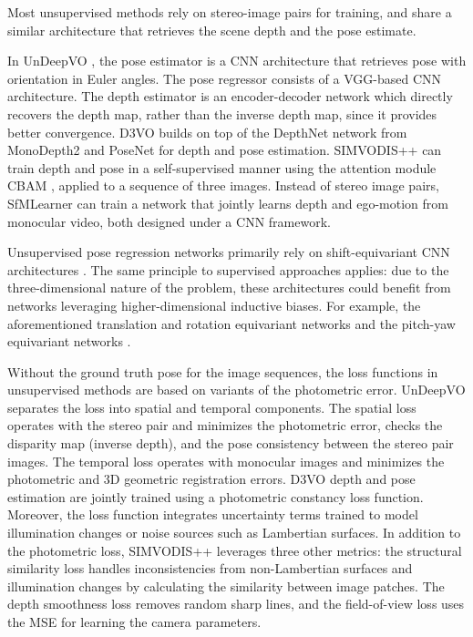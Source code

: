 Most unsupervised methods rely on stereo-image pairs for training, and share a similar architecture that retrieves the scene depth and the pose estimate.

In UnDeepVO \cite{li2018undeepvo}, the pose estimator is a \ac{CNN} architecture that retrieves pose with orientation in Euler angles. The pose regressor consists of a VGG-based \cite{dl:loopclosure:vgg16} \ac{CNN} architecture. The depth estimator is an encoder-decoder network which directly recovers the depth map, rather than the inverse depth map, since it provides better convergence. 
D3VO \cite{yang2020d3vo} builds on top of the DepthNet network from MonoDepth2 \cite{godard2019monodepth2} and PoseNet for depth and pose estimation. SIMVODIS++\cite{kimICRA22simvodis++} can train depth and pose in a self-supervised manner using the attention module CBAM \cite{woo2018cbam}, applied to a sequence of three images.
Instead of stereo image pairs, SfMLearner \cite{zhou2017unsupervisedmono} can train a network that jointly learns depth and ego-motion from monocular video, both designed under a CNN framework. 

Unsupervised pose regression networks primarily rely on shift-equivariant CNN architectures \cite{dl:vo:cotogni2022offset}. The same principle to supervised approaches applies: due to the three-dimensional nature of the problem, these architectures could benefit from networks leveraging higher-dimensional inductive biases. For example, the aforementioned translation and rotation equivariant networks and the pitch-yaw equivariant networks \cite{dl:vo:equivfeaturesforposeregression,dl:vo:brynte2022rigidity}.

Without the ground truth pose for the image sequences, the loss functions in unsupervised methods are based on variants of the photometric error.
UnDeepVO separates the loss into spatial and temporal components. The spatial loss operates with the stereo pair and minimizes the photometric error, checks the disparity map (inverse depth), and the pose consistency between the stereo pair images. The temporal loss operates with monocular images and minimizes the photometric and 3D geometric registration errors.
D3VO depth and pose estimation are jointly trained using a photometric constancy loss function. Moreover, the loss function integrates uncertainty terms trained to model illumination changes or noise sources such as Lambertian surfaces.
In addition to the photometric loss, SIMVODIS++ leverages three other metrics: the structural similarity loss handles inconsistencies from non-Lambertian surfaces and illumination changes by calculating the similarity between image patches. The depth smoothness loss removes random sharp lines, and the field-of-view loss uses the \ac{MSE} for learning the camera parameters.


